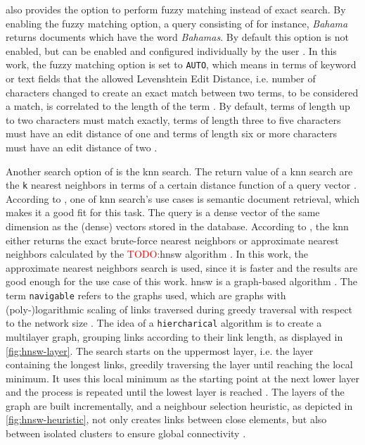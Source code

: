\databaseName{} also provides the option to perform fuzzy matching instead of exact search.
By enabling the fuzzy matching option, a \databaseName{} query consisting of for instance, \textit{Bahama} returns documents which have the word \textit{Bahamas}.
By default this option is not enabled, but can be enabled and configured individually by the user \cite{Elasticsearch-match}.
In this work, the fuzzy matching option is set to \texttt{AUTO}, which means in terms of keyword or text fields that the allowed Levenshtein Edit Distance, 
i.e. number of characters changed to create an exact match between two terms, to be considered a match, is correlated to the length of the term \cite{Elasticsearch-fuzziness}.
By default, terms of length up to two characters must match exactly, terms of length three to five characters must have an edit distance of one and 
terms of length six or more characters must have an edit distance of two \cite{Elasticsearch-fuzziness}.

Another search option of \databaseName{} is the \ac{knn} search.
The return value of a \ac{knn} search are the \texttt{k} nearest neighbors in terms of a certain distance function of a query vector \cite{Elasticsearch-kNN-HNSW}.
According to \citeauthor{Elasticsearch-kNN-HNSW}, one of \ac{knn} search's use cases is semantic document retrieval, which makes it a good fit for this task.
The query is a dense vector of the same dimension as the (dense) vectors stored in the database.
According to \cite{Elasticsearch-knn}, the \ac{knn} either returns the exact brute-force nearest neighbors or approximate nearest neighbors calculated by the \textcolor{red}{TODO:}\ac{hnsw} algorithm \cite{Elasticsearch-kNN-HNSW, Elasticsearch-knn}.
In this work, the approximate nearest neighbors search is used, since it is faster and the results are good enough for the use case of this work.
\ac{hnsw} is a graph-based algorithm \cite{Elasticsearch-kNN-HNSW}.
The term \texttt{navigable} refers to the graphs used, which are graphs with (poly-)logarithmic scaling of links traversed during greedy traversal with respect to the network size \cite{Elasticsearch-kNN-HNSW}.
The idea of a \texttt{hiercharical} algorithm is to create a multilayer graph, grouping links according to their link length, as displayed in \autoref{fig:hnsw-layer}. 
The search starts on the uppermost layer, i.e. the layer containing the longest links, greedily traversing the layer until reaching the local minimum.
It uses this local minimum as the starting point at the next lower layer and the process is repeated until the lowest layer is reached \cite{Elasticsearch-kNN-HNSW}.
The layers of the graph are built incrementally, and a neighbour selection heuristic, as depicted in \autoref{fig:hnsw-heuristic}, not only creates links between close elements, 
but also between isolated clusters to ensure global connectivity \cite{Elasticsearch-kNN-HNSW}.

